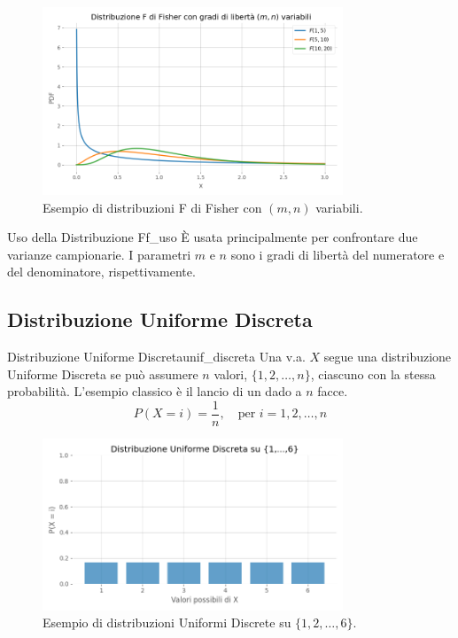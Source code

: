 \begin{figure}[H]
    \centering
    \includegraphics[width=0.8\textwidth]{images/th_01_03/f_fisher.png}
    \caption{Esempio di distribuzioni F di Fisher con \((m,n)\) variabili.}
    \label{fig:f_fisher}
\end{figure}

\begin{nota}{Uso della Distribuzione F}{f_uso}
È usata principalmente per confrontare due varianze campionarie. I parametri \(m\) e \(n\) sono i gradi di libertà del numeratore e del denominatore, rispettivamente.
\end{nota}

\subsection{Distribuzione Uniforme Discreta}

\begin{definizione}{Distribuzione Uniforme Discreta}{unif_discreta}
Una v.a. \(X\) segue una distribuzione Uniforme Discreta se può assumere \(n\) valori, \(\{1, 2, \dots, n\}\), ciascuno con la stessa probabilità. L'esempio classico è il lancio di un dado a \(n\) facce.
\[
P(X = i) = \frac{1}{n}, \quad \text{per } i=1, 2, \dots, n
\]
\end{definizione}

\begin{figure}[H]
    \centering
    \includegraphics[width=0.8\textwidth]{images/th_01_03/uniforme_discreta.png}
    \caption{Esempio di distribuzioni Uniformi Discrete su \(\{1, 2, \dots, 6\}\).}
    \label{fig:uniforme_discreta}
\end{figure}

